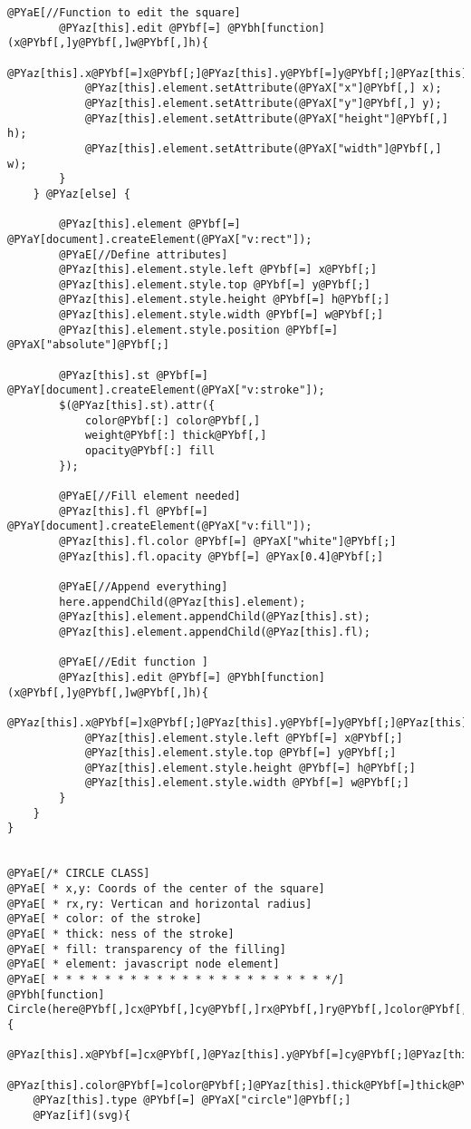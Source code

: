 \begin{Verbatim}[commandchars=@\[\]]
		@PYaE[//Function to edit the square]
		@PYaz[this].edit @PYbf[=] @PYbh[function](x@PYbf[,]y@PYbf[,]w@PYbf[,]h){
			@PYaz[this].x@PYbf[=]x@PYbf[;]@PYaz[this].y@PYbf[=]y@PYbf[;]@PYaz[this].width@PYbf[=]w@PYbf[;]@PYaz[this].height@PYbf[=]h@PYbf[;]
			@PYaz[this].element.setAttribute(@PYaX["x"]@PYbf[,] x);
	        @PYaz[this].element.setAttribute(@PYaX["y"]@PYbf[,] y);
	        @PYaz[this].element.setAttribute(@PYaX["height"]@PYbf[,] h);
	        @PYaz[this].element.setAttribute(@PYaX["width"]@PYbf[,] w);
		}
	} @PYaz[else] {
		
		@PYaz[this].element @PYbf[=] @PYaY[document].createElement(@PYaX["v:rect"]);
		@PYaE[//Define attributes]
		@PYaz[this].element.style.left @PYbf[=] x@PYbf[;]
		@PYaz[this].element.style.top @PYbf[=] y@PYbf[;]
		@PYaz[this].element.style.height @PYbf[=] h@PYbf[;]
		@PYaz[this].element.style.width @PYbf[=] w@PYbf[;]
		@PYaz[this].element.style.position @PYbf[=] @PYaX["absolute"]@PYbf[;]
		
		@PYaz[this].st @PYbf[=] @PYaY[document].createElement(@PYaX["v:stroke"]);
        $(@PYaz[this].st).attr({
            color@PYbf[:] color@PYbf[,]
            weight@PYbf[:] thick@PYbf[,]
            opacity@PYbf[:] fill
        });
		
		@PYaE[//Fill element needed]
		@PYaz[this].fl @PYbf[=] @PYaY[document].createElement(@PYaX["v:fill"]);
		@PYaz[this].fl.color @PYbf[=] @PYaX["white"]@PYbf[;]
		@PYaz[this].fl.opacity @PYbf[=] @PYax[0.4]@PYbf[;]
		
		@PYaE[//Append everything]
		here.appendChild(@PYaz[this].element);
		@PYaz[this].element.appendChild(@PYaz[this].st);
		@PYaz[this].element.appendChild(@PYaz[this].fl);
		
		@PYaE[//Edit function ]
		@PYaz[this].edit @PYbf[=] @PYbh[function](x@PYbf[,]y@PYbf[,]w@PYbf[,]h){
			@PYaz[this].x@PYbf[=]x@PYbf[;]@PYaz[this].y@PYbf[=]y@PYbf[;]@PYaz[this].width@PYbf[=]w@PYbf[;]@PYaz[this].height@PYbf[=]h@PYbf[;]
			@PYaz[this].element.style.left @PYbf[=] x@PYbf[;]
	        @PYaz[this].element.style.top @PYbf[=] y@PYbf[;]
	        @PYaz[this].element.style.height @PYbf[=] h@PYbf[;]
	        @PYaz[this].element.style.width @PYbf[=] w@PYbf[;]
		}
	}
}


@PYaE[/* CIRCLE CLASS]
@PYaE[ * x,y: Coords of the center of the square]
@PYaE[ * rx,ry: Vertican and horizontal radius]
@PYaE[ * color: of the stroke]
@PYaE[ * thick: ness of the stroke]
@PYaE[ * fill: transparency of the filling]
@PYaE[ * element: javascript node element]
@PYaE[ * * * * * * * * * * * * * * * * * * * * * */]
@PYbh[function] Circle(here@PYbf[,]cx@PYbf[,]cy@PYbf[,]rx@PYbf[,]ry@PYbf[,]color@PYbf[,]thick@PYbf[,]fill){
	@PYaz[this].x@PYbf[=]cx@PYbf[,]@PYaz[this].y@PYbf[=]cy@PYbf[;]@PYaz[this].rx@PYbf[=]rx@PYbf[;]@PYaz[this].ry@PYbf[=]ry@PYbf[;]
	@PYaz[this].color@PYbf[=]color@PYbf[;]@PYaz[this].thick@PYbf[=]thick@PYbf[;]@PYaz[this].fill@PYbf[=]fill@PYbf[;]
	@PYaz[this].type @PYbf[=] @PYaX["circle"]@PYbf[;]
	@PYaz[if](svg){
	

\end{Verbatim}
